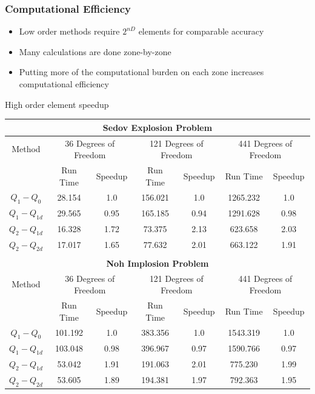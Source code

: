 \documentclass[8pt,xcolor=svgnames]{beamer}
\begin{document}
\begin{frame}
 \frametitle{Computational Efficiency}
\begin{itemize}
 \item Low order methods require $2^{nD}$ elements for comparable accuracy
 \item Many calculations are done zone-by-zone
 \item Putting more of the computational burden on each zone increases computational efficiency
\end{itemize}

\begin{block}{High order element speedup}
\begin{center}
\begin{tabular}[c]{|c|cc|cc|cc|}
\hline
\multicolumn{7}{|c|}{\textbf{Sedov Explosion Problem}} \\
\hline
Method & \multicolumn{2}{|c|}{36 Degrees of Freedom} & \multicolumn{2}{|c|}{121 Degrees of Freedom} & \multicolumn{2}{|c|}{441 Degrees of Freedom}\\
\hline
 & Run Time & Speedup & Run Time & Speedup & Run Time & Speedup\\
$Q_1-Q_0$ & 28.154 & 1.0 & 156.021 & 1.0 & 1265.232 & 1.0 \\
$Q_1-Q_{1d}$ & 29.565 & 0.95 & 165.185 & 0.94 & 1291.628 & 0.98 \\
$Q_2-Q_{1d}$ & 16.328 & 1.72 & 73.375  & 2.13 & 623.658 & 2.03 \\
$Q_2-Q_{2d}$ & 17.017 & 1.65 & 77.632  & 2.01 & 663.122 & 1.91 \\
\hline
\multicolumn{7}{c}{} \\
\hline
\multicolumn{7}{|c|}{\textbf{Noh Implosion Problem}} \\
\hline
Method & \multicolumn{2}{|c|}{36 Degrees of Freedom} & \multicolumn{2}{|c|}{121 Degrees of Freedom} & \multicolumn{2}{|c|}{441 Degrees of Freedom}\\
\hline
 & Run Time & Speedup & Run Time & Speedup & Run Time & Speedup\\
$Q_1-Q_0$    & 101.192 & 1.0 & 383.356 & 1.0 & 1543.319 & 1.0 \\
$Q_1-Q_{1d}$ & 103.048 & 0.98 & 396.967 & 0.97 & 1590.766 & 0.97 \\
$Q_2-Q_{1d}$ & 53.042 & 1.91 & 191.063  & 2.01 & 775.230 & 1.99 \\
$Q_2-Q_{2d}$ & 53.605 & 1.89 & 194.381  & 1.97 & 792.363 & 1.95 \\
\hline
\end{tabular}
\end{center}
\end{block}

\end{frame}
\end{document}
